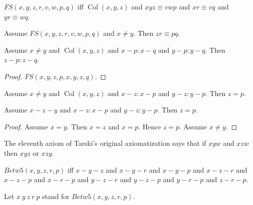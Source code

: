 \documentclass{article}
\newcommand{\Cong}[4]{#1 #2 \equiv #3 #4}
\newcommand{\Betw}[3]{#1 #2 #3}
\newcommand{\Col}[3]{\operatorname{Col}(#1, #2, #3)}
\newcommand{\SenaryCong}[6]{#1 #2 #3 \equiv #4 #5 #6}
\begin{document}
  \begin{forthel}
    \begin{definition} %
      $FS(x,y,z,r,v,w,p,q)$ iff $\Col{x}{y}{z}$ and
      $\SenaryCong{x}{y}{z}{v}{w}{p}$ and
      $\Cong{x}{r}{v}{q}$ and
      $\Cong{y}{r}{w}{q}$.
    \end{definition}

    \begin{axiom} %
      Assume $FS(x,y,z,r,v,w,p,q)$ and $x \neq y$.
      Then $\Cong{z}{r}{p}{q}$.
    \end{axiom}


    \begin{lemma} %
      Assume $x \neq y$ and $\Col{x}{y}{z}$ and $x-p : x-q$ and $y-p : y-q$. Then $z-p : z-q$.
    \end{lemma}
    \begin{proof}
    	$FS(x,y,z,p,x,y,z,q)$.
    \end{proof}


    \begin{lemma} %
      Assume $x \neq y$ and $\Col{x}{y}{z}$ and $x-z : x-p$ and $y-z : y-p$. Then $z = p$.
    \end{lemma}

    \begin{lemma} %
      Assume $x-z-y$ and $x-z : x-p$ and $y-z : y-p$. Then $z = p$.
    \end{lemma}
    \begin{proof}
      Assume $x = y$. Then $x = z$ and $x = p$. Hence $z = p$. Assume $x \neq y$.
    \end{proof}
  \end{forthel}

  The eleventh axiom of Tarski's original axiomatization says that
  if $\Betw{x}{y}{w}$ and $\Betw{x}{z}{w}$
  then $\Betw{x}{y}{z}$ or $\Betw{x}{z}{y}$.


  \begin{forthel}
    \begin{definition} %
      $Betw5(x,y,z,r,p)$ iff $x-y-z$ and $x-y-r$ and $x-y-p$ and $x-z-r$ and $x-z-p$ and $x-r-p$ and $y-z-r$ and $y-z-p$ and $y-r-p$ and $z-r-p$.
    \end{definition}

    Let $x~y~z~r~p$ stand for $Betw5(x,y,z,r,p)$.
  \end{forthel}
\end{document}
